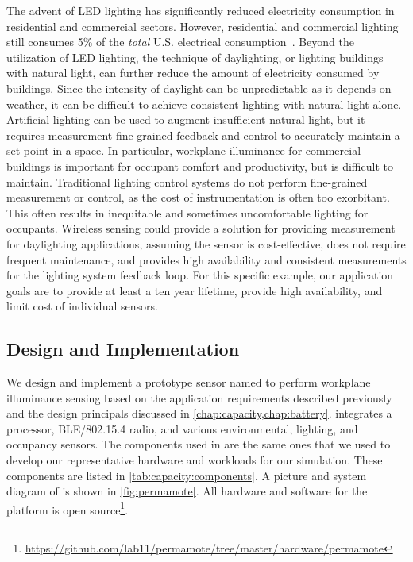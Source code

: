 The advent of LED lighting has significantly reduced electricity consumption in residential and commercial sectors. However, residential and commercial lighting still consumes 5\% of the \textit{total} U.S. electrical consumption~\cite{aeo2022}.
Beyond the utilization of LED lighting, the technique of daylighting, or lighting buildings with natural light, can further reduce the amount of electricity consumed by buildings. 
Since the intensity of daylight can be unpredictable as it depends on weather, it can be difficult to achieve consistent lighting with natural light alone.
Artificial lighting can be used to augment insufficient natural light, but it requires measurement fine-grained feedback and control to accurately maintain a set point in a space.
In particular, workplane illuminance for commercial buildings is important for occupant comfort and productivity, but is difficult to maintain. 
Traditional lighting control systems do not perform fine-grained measurement or control, as the cost of instrumentation is often too exorbitant.
This often results in inequitable and sometimes uncomfortable lighting for occupants.
Wireless sensing could provide a solution for providing measurement for daylighting applications, assuming the sensor is cost-effective, does not require frequent maintenance, and provides high availability and consistent measurements for the lighting system feedback loop.
For this specific example, our application goals are to provide at least a ten year lifetime, provide high availability, and limit cost of individual sensors. 


\subsection{Design and Implementation}
We design and implement a prototype sensor named \name to perform workplane illuminance sensing based on the application requirements described previously and the design principals discussed in \cref{chap:capacity,chap:battery}.
\name integrates a processor, BLE/802.15.4 radio, and various environmental, lighting,
and occupancy sensors. 
The components used in \name are the same ones that we used to develop our representative hardware and workloads for our simulation. 
These components are listed in \cref{tab:capacity:components}. 
A picture
and system diagram of \name is shown in \cref{fig:permamote}. All hardware
and software for the platform is open source\footnote{\url{https://github.com/lab11/permamote/tree/master/hardware/permamote}}.

